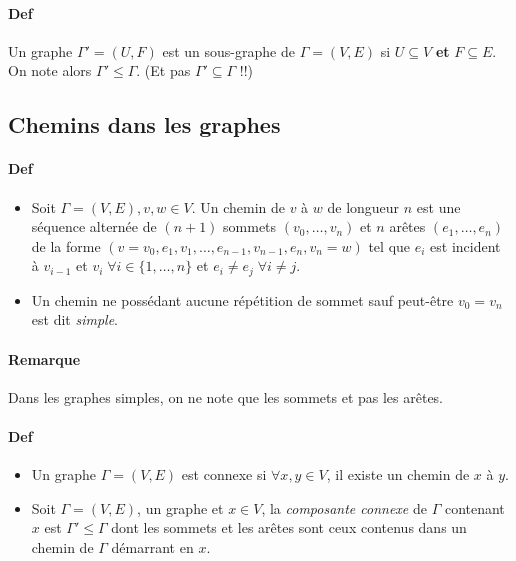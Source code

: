 \documentclass{article}
\newenvironment{lst}
	{\begin{minipage}[t]{.9\linewidth}\begin{itemize}}
	{\end{itemize}\end{minipage}}
\begin{document}
			\paragraph{Def} Un graphe $\Gamma' = (U, F)$ est un sous-graphe de $\Gamma = (V, E)$ si $U \subseteq V$ \textbf{et} $F \subseteq E$.
			On note alors $\Gamma' \leq \Gamma$. (Et pas $\Gamma' \subseteq \Gamma$ !!)

		\subsection{Chemins dans les graphes}
			\paragraph{Def}
				\begin{lst}
					\item Soit $\Gamma = (V, E), v, w \in V$. Un chemin de $v$ à $w$ de longueur $n$ est une séquence alternée de $(n+1)$ sommets
						  $(v_0, \ldots, v_n)$ et $n$ arêtes $(e_1, \ldots, e_n)$ de la forme $(v = v_0, e_1, v_1, \ldots, e_{n-1}, v_{n-1}, e_n, v_n = w)$
						  tel que $e_i$ est incident à $v_{i-1}$ et $v_i \; \forall i \in \{1, \ldots, n\}$ et $e_i \neq e_j \; \forall i \neq j$.

					\item Un chemin ne possédant aucune répétition de sommet sauf peut-être $v_0 = v_n$ est dit \textit{simple}.
				\end{lst}

			\paragraph{Remarque} Dans les graphes simples, on ne note que les sommets et pas les arêtes.

			\paragraph{Def}
				\begin{lst}
					\item Un graphe $\Gamma = (V, E)$ est connexe si $\forall x, y \in V$, il existe un chemin de $x$ à $y$.
					\item Soit $\Gamma = (V, E)$, un graphe et $x \in V$, la \textit{composante connexe} de $\Gamma$ contenant $x$ est
						  $\Gamma' \leq \Gamma$ dont les sommets et les arêtes sont ceux contenus dans un chemin de $\Gamma$ démarrant en $x$.
				\end{lst}
\end{document}
